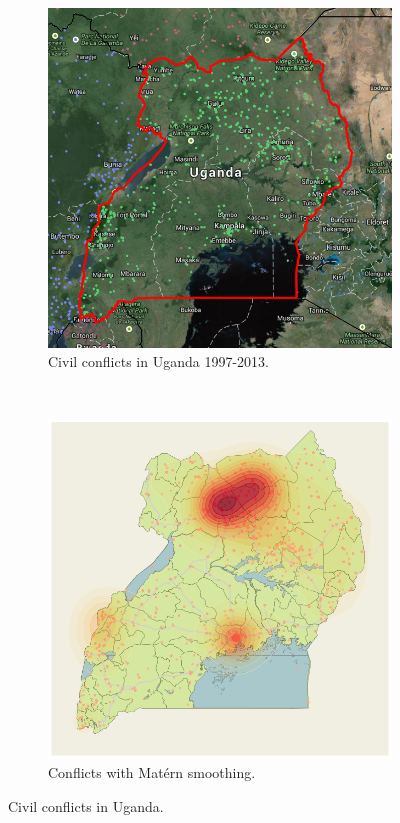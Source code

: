 \documentclass{article} %
\begin{document}
\begin{figure}
  \centering
  \begin{subfigure}[b]{0.5\textwidth}
    \centering
    \includegraphics[width=\textwidth]{figures/uganda}
    \caption{Civil conflicts in Uganda 1997-2013.}
    \label{fig:map-points}
  \end{subfigure}~\begin{subfigure}[b]{0.5\textwidth}
    \centering
    \includegraphics[width=\textwidth]{figures/map-with-smoothed-data}
    \caption{Conflicts with Mat\'{e}rn smoothing.}
    \label{fig:map-smoothed}
  \end{subfigure}
  \caption{Civil conflicts in Uganda.}
  \label{fig:map}
\end{figure}
\end{document}
